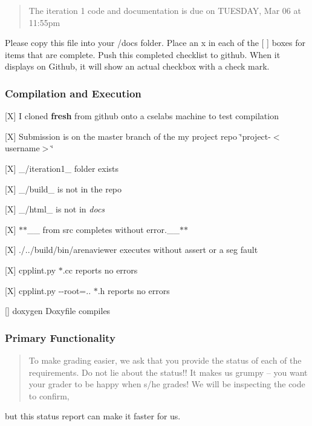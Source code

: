 \begin{quote}
The iteration 1 code and documentation is due on T\+U\+E\+S\+D\+AY, Mar 06 at 11\+:55pm \end{quote}


Please copy this file into your /docs folder. Place an \textquotesingle{}x\textquotesingle{} in each of the {\ttfamily \mbox{[} \mbox{]}} boxes for items that are complete. Push this completed checklist to github. When it displays on Github, it will show an actual checkbox with a check mark.

\subsubsection*{Compilation and Execution}


\begin{DoxyItemize}
\item \mbox{[}X\mbox{]} I cloned {\bfseries fresh} from github onto a cselabs machine to test compilation
\item \mbox{[}X\mbox{]} Submission is on the master branch of the my project repo \char`\"{}project-\/$<$username$>$\char`\"{}
\item \mbox{[}X\mbox{]} \+\_\+/iteration1\+\_\+ folder exists
\item \mbox{[}X\mbox{]} \+\_\+/build\+\_\+ is not in the repo
\item \mbox{[}X\mbox{]} \+\_\+/html\+\_\+ is not in {\itshape docs}
\item \mbox{[}X\mbox{]} $\ast$$\ast$\+\_\+\+\_ from src completes without error.\+\_\+\+\_\+$\ast$$\ast$
\item \mbox{[}X\mbox{]} {\ttfamily ./../build/bin/arenaviewer} executes without assert or a seg fault
\item \mbox{[}X\mbox{]} {\ttfamily cpplint.\+py $\ast$.cc} reports no errors
\item \mbox{[}X\mbox{]} {\ttfamily cpplint.\+py -\/-\/root=.. $\ast$.h} reports no errors
\item \mbox{[}\mbox{]} {\ttfamily doxygen Doxyfile} compiles
\end{DoxyItemize}

\subsubsection*{Primary Functionality}

\begin{quote}
To make grading easier, we ask that you provide the status of each of the requirements. Do not lie about the status!! It makes us grumpy -- you want your grader to be happy when s/he grades! We will be inspecting the code to confirm, \end{quote}
but this status report can make it faster for us.

